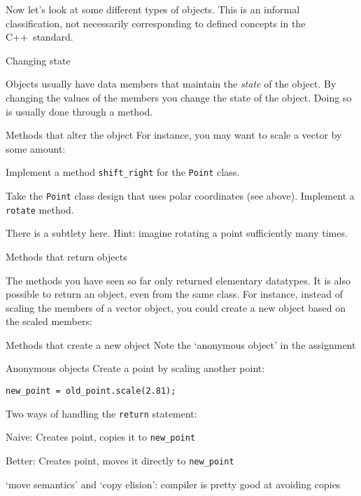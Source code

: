 Now let's look at some different types of objects.
This is an informal classification, not necessarily
corresponding to defined concepts in the C++~standard.

 {Changing state}

Objects usually have data members that maintain the
\emph{state} of the object.
By changing the
values of the members you change the state of the object.
Doing so is
usually done through a method.

\begin{block}{Methods that alter the object}
  \label{sl:obj-func-on}
  For instance, you may want to scale a vector by some amount:
\end{block}

\begin{exercise}
  \label{ex:shift-point-right}
  Implement a method \lstinline+shift_right+ for the \lstinline{Point} class.
\end{exercise}

\begin{exercise}
  \label{ex:polar-rotate}
  Take the \lstinline{Point} class design that uses polar coordinates
  (see above).
  Implement a \lstinline{rotate} method.

  There is a subtlety here. Hint: imagine rotating a point
  sufficiently many times.
\end{exercise}

 {Methods that return objects}

The methods you have seen so far only returned elementary
datatypes. It is also possible to return an object, even from the same
class. For instance, instead of scaling the members of a vector object, you
could create a new object based on the scaled members:
%

\begin{slide}{Methods that create a new object}
  \label{sl:obj-return}
  Note the `anonymous object' in the assignment
\end{slide}

\begin{block}{Anonymous objects}
  \label{sl:obj-return-move}
Create a point by scaling another point:
\begin{lstlisting}
new_point = old_point.scale(2.81);
\end{lstlisting}

  Two ways of handling the \lstinline{return} statement:
  \lstset{style=snippetcode}
  \begin{multicols}{2}
    \footnotesize
    Naive:
    Creates point, copies it to \lstinline+new_point+
    \par\vfill \columnbreak
    Better:
    Creates point, moves it directly to \lstinline+new_point+
  \end{multicols}
  `move semantics' and `copy elision':\slidebreak
  compiler is pretty good at avoiding copies
\end{block}

